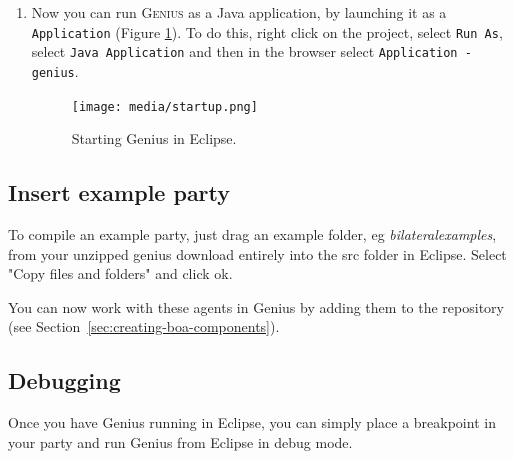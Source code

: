 \documentclass[]{article}
\newcommand\Genius{{\sc Genius}}
\begin{document}
\begin{enumerate}
   
\item Now you can run G\textsc{enius} as a Java application, by launching it as a \texttt{Application} (Figure \ref{fig:startgenius}). To do this, right click on the project, select \texttt{Run As}, select \texttt{Java Application} and then in the browser select \texttt{Application - genius}.

\begin{figure}[h!]
	\centering
		\texttt{[image: media/startup.png]}
		\caption{Starting {\Genius} in Eclipse.}
	\label{fig:startgenius}
\end{figure}
\end{enumerate}

\FloatBarrier

\subsection{Insert example party}
To compile an example party, just drag an example folder, eg \emph{bilateralexamples}, from your unzipped genius download entirely into the src folder in Eclipse. Select "Copy files and folders" and click ok. 

You can now work with these agents in {\Genius} by adding them to the repository (see Section~\ref{sec:creating-boa-components}).

\subsection{Debugging}
Once you have Genius running in Eclipse, you can simply place a breakpoint in your party and run Genius from Eclipse in debug mode.






\end{document}
